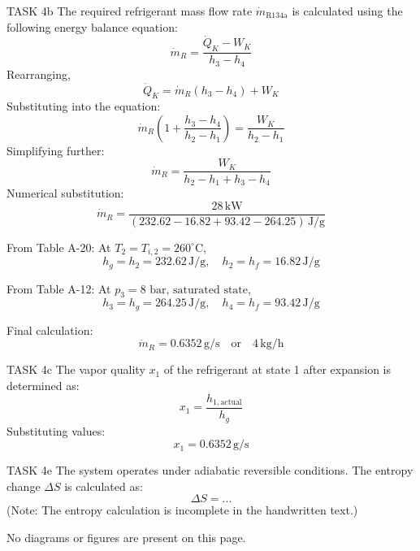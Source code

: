 TASK 4b  
The required refrigerant mass flow rate \( \dot{m}_{\text{R134a}} \) is calculated using the following energy balance equation:  
\[
\dot{m}_R = \frac{\dot{Q}_K - W_K}{h_3 - h_4}
\]  
Rearranging,  
\[
\dot{Q}_K = \dot{m}_R (h_3 - h_4) + W_K
\]  
Substituting into the equation:  
\[
\dot{m}_R \left( 1 + \frac{h_3 - h_4}{h_2 - h_1} \right) = \frac{W_K}{h_2 - h_1}
\]  
Simplifying further:  
\[
\dot{m}_R = \frac{W_K}{h_2 - h_1 + h_3 - h_4}
\]  
Numerical substitution:  
\[
\dot{m}_R = \frac{28 \, \text{kW}}{(232.62 - 16.82 + 93.42 - 264.25) \, \text{J/g}}
\]  

From Table A-20:  
At \( T_2 = T_{i,2} = 260^\circ\text{C} \),  
\[
h_g = h_2 = 232.62 \, \text{J/g}, \quad h_2 = h_f = 16.82 \, \text{J/g}
\]  

From Table A-12:  
At \( p_3 = \text{8 bar, saturated state} \),  
\[
h_3 = h_g = 264.25 \, \text{J/g}, \quad h_4 = h_f = 93.42 \, \text{J/g}
\]  

Final calculation:  
\[
\dot{m}_R = 0.6352 \, \text{g/s} \quad \text{or} \quad 4 \, \text{kg/h}
\]  

TASK 4c  
The vapor quality \( x_1 \) of the refrigerant at state 1 after expansion is determined as:  
\[
x_1 = \frac{h_{1,\text{actual}}}{h_g}
\]  
Substituting values:  
\[
x_1 = 0.6352 \, \text{g/s}
\]  

TASK 4e  
The system operates under adiabatic reversible conditions. The entropy change \( \Delta S \) is calculated as:  
\[
\Delta S = ...
\]  
(Note: The entropy calculation is incomplete in the handwritten text.)  

No diagrams or figures are present on this page.